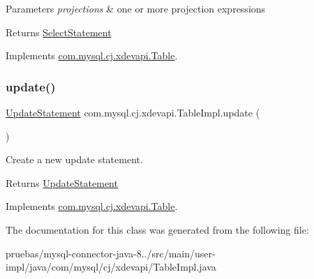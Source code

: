 \begin{DoxyParams}{Parameters}
{\em projections} & one or more projection expressions \\
\hline
\end{DoxyParams}
\begin{DoxyReturn}{Returns}
\mbox{\hyperlink{interfacecom_1_1mysql_1_1cj_1_1xdevapi_1_1_select_statement}{Select\+Statement}} 
\end{DoxyReturn}


Implements \mbox{\hyperlink{interfacecom_1_1mysql_1_1cj_1_1xdevapi_1_1_table_a36559f114d9638a63d8743f1f1630017}{com.\+mysql.\+cj.\+xdevapi.\+Table}}.

\mbox{\label{classcom_1_1mysql_1_1cj_1_1xdevapi_1_1_table_impl_a4f6da4761f5ff7becb0737c11b0ea0db}} 
\subsubsection{\texorpdfstring{update()}{update()}}
{\footnotesize\ttfamily \mbox{\hyperlink{interfacecom_1_1mysql_1_1cj_1_1xdevapi_1_1_update_statement}{Update\+Statement}} com.\+mysql.\+cj.\+xdevapi.\+Table\+Impl.\+update (\begin{DoxyParamCaption}{ }\end{DoxyParamCaption})}

Create a new update statement.

\begin{DoxyReturn}{Returns}
\mbox{\hyperlink{interfacecom_1_1mysql_1_1cj_1_1xdevapi_1_1_update_statement}{Update\+Statement}} 
\end{DoxyReturn}


Implements \mbox{\hyperlink{interfacecom_1_1mysql_1_1cj_1_1xdevapi_1_1_table_a941215cefeb7236388db7d0390621a17}{com.\+mysql.\+cj.\+xdevapi.\+Table}}.



The documentation for this class was generated from the following file\+:\begin{DoxyCompactItemize}
\item 
pruebas/mysql-\/connector-\/java-\/8../src/main/user-\/impl/java/com/mysql/cj/xdevapi/Table\+Impl.\+java\end{DoxyCompactItemize}
